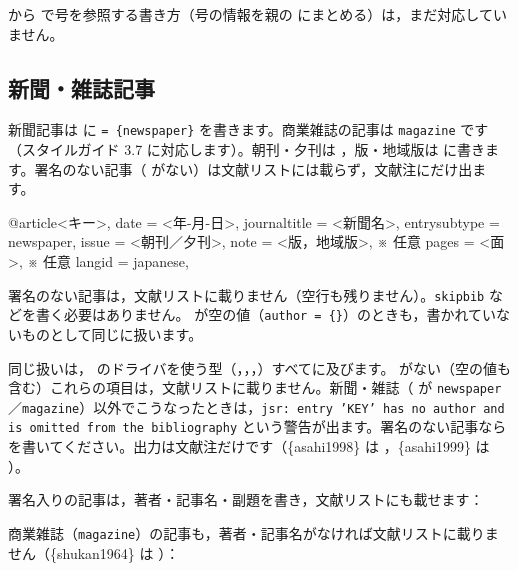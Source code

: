 
\begin{caution}
 から  で号を参照する書き方（号の情報を親の  にまとめる）は，まだ対応していません。
\end{caution}

\subsection{新聞・雑誌記事}\label{sec:news}
新聞記事は  に  \texttt{= \{newspaper\}} を書きます。商業雑誌の記事は \texttt{magazine} です（スタイルガイド 3.7 に対応します）。朝刊・夕刊は ，版・地域版は  に書きます。署名のない記事（ がない）は文献リストには載らず，文献注にだけ出ます。

\begin{bibtemplate}
@article{<キー>,
  date         = {<年-月-日>},
  journaltitle = {<新聞名>},
  entrysubtype = {newspaper},
  issue        = {<朝刊／夕刊>},
  note         = {<版，地域版>},   ※ 任意
  pages        = {<面>},            ※ 任意
  langid       = {japanese},
}
\end{bibtemplate}

署名のない記事は，文献リストに載りません（空行も残りません）。\texttt{skipbib} などを書く必要はありません。 が空の値（\texttt{author = \{\}}）のときも，書かれていないものとして同じに扱います。

同じ扱いは， のドライバを使う型（，，，）すべてに及びます。 がない（空の値も含む）これらの項目は，文献リストに載りません。新聞・雑誌（ が \texttt{newspaper}／\texttt{magazine}）以外でこうなったときは，\texttt{jsr: entry 'KEY' has no author and is omitted from the bibliography} という警告が出ます。署名のない記事なら  を書いてください。出力は文献注だけです（\{asahi1998\} は {\parencite{asahi1998}}，\{asahi1999\} は {\parencite{asahi1999}}）。


署名入りの記事は，著者・記事名・副題を書き，文献リストにも載せます：


商業雑誌（\texttt{magazine}）の記事も，著者・記事名がなければ文献リストに載りません（\{shukan1964\} は {\parencite{shukan1964}}）：

